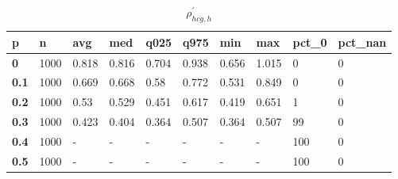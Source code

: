 \begin{table}[h]
 \centering 
\footnotesize
\caption{$\rho_{hcg,h}^\prime $}
\label{tab:alphahcgh}
\begin{tabular}[h]{|l|l|l|l|l|l|l|l|l|l|
    } \hline
\textbf{ p} & \textbf{ n} & \textbf{ avg} & \textbf{ med} & \textbf{ q025} & \textbf{ q975} & \textbf{ min} & \textbf{ max} & \textbf{ pct\_0} & \textbf{ pct\_nan}
    \\ \hline
  \textbf{  0} & 1000 & 0.818 & 0.816 & 0.704 & 0.938 & 0.656 & 1.015 &   0 & 0
    \\ \hline
  \textbf{0.1} & 1000 & 0.669 & 0.668 &  0.58 & 0.772 & 0.531 & 0.849 &   0 & 0
    \\ \hline
  \textbf{0.2} & 1000 &  0.53 & 0.529 & 0.451 & 0.617 & 0.419 & 0.651 &   1 & 0
    \\ \hline
  \textbf{0.3} & 1000 & 0.423 & 0.404 & 0.364 & 0.507 & 0.364 & 0.507 &  99 & 0
    \\ \hline
  \textbf{0.4} & 1000 & - & - & - & - & - & - & 100 & 0
    \\ \hline
  \textbf{0.5} & 1000 & - & - & - & - & - & - & 100 & 0
    \\ \hline
 \end{tabular}
 \end{table}
